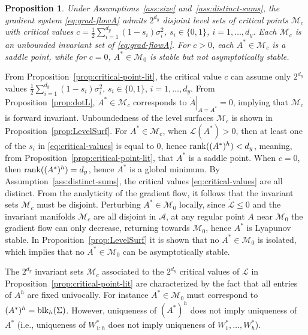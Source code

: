 \documentclass{article}
\makeatletter
\renewenvironment{proof}[1][\proofname]{
  \par\pushQED{\qed}\normalfont
  \topsep6\p@\@plus6\p@\relax
  \trivlist\item[\hskip\labelsep\bfseries#1\@addpunct{.}]
  \ignorespaces
}{
  \popQED\endtrivlist\@endpefalse
}
\newtheorem{proposition}{Proposition}
\def\rank{{\rm rank}}
\def\block{{\rm blk}}
\newcommand{\1}{\mathds{1}}
\makeatother
\begin{document}
\begin{proposition}
Under Assumptions~\ref{ass:size} and~\ref{ass:distinct-sums}, the gradient system \eqref{eq:grad-flowA} admits $ 2^{d_y} $ disjoint level sets of critical points $ \mathcal{M}_c $ with critical values $ c= \frac{1}{2}\sum_{i=1}^{d_y} (1-s_i) \sigma_i^2 $, $ s_i \in \{0, 1 \}$, $ i=1, \ldots, d_y$.
Each $ \mathcal{M}_c $ is an unbounded invariant set of \eqref{eq:grad-flowA}. For $ c>0$, each $ A^\ast \in \mathcal{M}_c$ is a saddle point, while for $ c=0$, $ A^\ast \in \mathcal{M}_0$ is stable but not  asymptotically stable. 
\end{proposition}
\begin{proof}
From Proposition~\ref{prop:critical-point-lit}, the critical value $ c$ can assume only $ 2^{d_y} $ values $ \frac{1}{2}\sum_{i=1}^{d_y} (1-s_i) \sigma_i^2 $, $ s_i \in \{0, 1 \}$, $ i=1, \ldots, d_y$.
From Proposition~\ref{prop:dotL}, $ A^\ast \in \mathcal{M}_c $ corresponds to $ \left. \dot A \right|_{A=A^\ast} =0$, implying that $ \mathcal{M}_c $ is forward invariant. 
Unboundedness of the level surfaces $ \mathcal{M}_c $ is shown in Proposition~\ref{prop:LevelSurf}. 
For $ A^\ast \in \mathcal{M}_c$, when $ \mathcal{L}(A^\ast)>0$, then at least one of the $ s_i $ in \eqref{eq:critical-values} is equal to 0, hence $ \rank((A^\ast)^h)<d_y $, meaning, from Proposition~\ref{prop:critical-point-lit}, that $A^\ast$ is a saddle point. 
When $ c=0$, then $ \rank((A^\ast)^h) =d_y$, hence $ A^\ast $ is a global minimum. 
By Assumption~\ref{ass:distinct-sums}, the critical values \eqref{eq:critical-values} are all distinct.
From the analyticity of the gradient flow, it follows that the invariant sets $ \mathcal{M}_c $ must be disjoint.
Perturbing $ A^\ast \in \mathcal{M}_0$ locally, since $ \dot{\mathcal{L}}\leq 0 $ and the invariant manifolds $ \mathcal{M}_c $ are all disjoint in $ \mathcal{A}$, at any regular point $ A$ near $ \mathcal{M}_0$ the gradient flow can only decrease, returning towards $ \mathcal{M}_0$, hence $ A^\ast $ is Lyapunov stable. 
In Proposition~\ref{prop:LevelSurf} it is shown that no $ A^\ast  \in \mathcal{M}_0 $ is isolated, which implies that no $ A^\ast \in \mathcal{M}_0  $ can be asymptotically stable. 
\end{proof}

The $ 2^{d_y}$ invariant sets $ \mathcal{M}_c $ associated to the $ 2^{d_y}$ critical values of $ \mathcal{L}$ in Proposition~\ref{prop:critical-point-lit} are characterized by the fact that all entries of $ A^h $ are fixed univocally. For instance $ A^\ast \in \mathcal{M}_0 $ must correspond to $ (A^\ast)^h = \block_h(\Sigma)$. 
However, uniqueness of $ (A^\ast)^h $ does not imply uniqueness of $A^\ast $ (i.e., uniqueness of $ W_{1:h}^\ast $ does not imply uniqueness of $ W_1^\ast, \ldots ,  W_h^\ast$).
\end{document}
